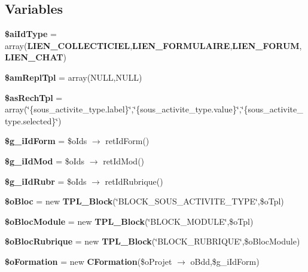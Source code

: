 \subsection*{Variables}
\begin{CompactItemize}
\item 
\textbf{\$aiIdType} = array({\bf LIEN\_\-COLLECTICIEL},{\bf LIEN\_\-FORMULAIRE},{\bf LIEN\_\-FORUM},{\bf LIEN\_\-CHAT})\label{tableau__bord-filtre_8php_66478bacf11fbf99142cd12953bbc666}

\item 
\textbf{\$amReplTpl} = array(NULL,NULL)\label{tableau__bord-filtre_8php_a1feffdde6e2958694639834d8c37dc2}

\item 
\textbf{\$asRechTpl} = array(\char`\"{}\{sous\_\-activite\_\-type.label\}\char`\"{},\char`\"{}\{sous\_\-activite\_\-type.value\}\char`\"{},\char`\"{}\{sous\_\-activite\_\-type.selected\}\char`\"{})\label{tableau__bord-filtre_8php_bd07968245fb1e375199f35ae8ed642b}

\item 
\textbf{\$g\_\-iIdForm} = \$oIds $\rightarrow$ retIdForm()\label{tableau__bord-filtre_8php_05d94d475bb2aa9608256609f52d7de4}

\item 
\textbf{\$g\_\-iIdMod} = \$oIds $\rightarrow$ retIdMod()\label{tableau__bord-filtre_8php_5f4f12fccae354bcdaa0d7273ded512d}

\item 
\textbf{\$g\_\-iIdRubr} = \$oIds $\rightarrow$ retIdRubrique()\label{tableau__bord-filtre_8php_3e1c6c388b47b584cf7f2490c6354868}

\item 
\textbf{\$oBloc} = new {\bf TPL\_\-Block}(\char`\"{}BLOCK\_\-SOUS\_\-ACTIVITE\_\-TYPE\char`\"{},\$oTpl)\label{tableau__bord-filtre_8php_d210a4d2f043e797de79c9d657e75a58}

\item 
\textbf{\$oBlocModule} = new {\bf TPL\_\-Block}(\char`\"{}BLOCK\_\-MODULE\char`\"{},\$oTpl)\label{tableau__bord-filtre_8php_29f5e94b3196330a990eec98c9a9e0f0}

\item 
\textbf{\$oBlocRubrique} = new {\bf TPL\_\-Block}(\char`\"{}BLOCK\_\-RUBRIQUE\char`\"{},\$oBlocModule)\label{tableau__bord-filtre_8php_b7f595d3192a04822b37aefca1472a4e}

\item 
\textbf{\$oFormation} = new {\bf CFormation}(\$oProjet $\rightarrow$ oBdd,\$g\_\-iIdForm)\label{tableau__bord-filtre_8php_5dbadfcf71ff9339b4bb2320f35a7b04}


\end{CompactItemize}
